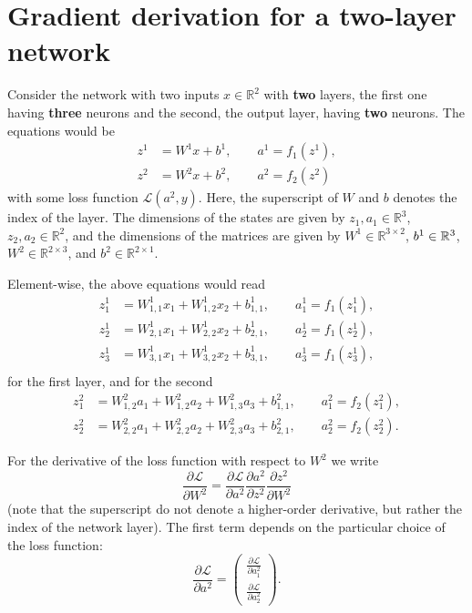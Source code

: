 \documentclass[a4paper,11pt]{article}
\newcommand{\of}[1]{\left( {#1} \right)}
\newcommand{\fracp}[2]{\frac{\partial{}{#1}}{\partial{}{#2}}}
\begin{document}
\section*{Gradient derivation for a two-layer network}
Consider the network with two inputs $x\in\mathbb{R}^2$ with {\bf two}
layers, the first one having {\bf three} neurons and the second, the
output layer, having {\bf two} neurons. The equations would be
\[
\begin{split}
z^1 &= W^1 x + b^1, \qquad a^1 = f_1\of{z^1},\\
z^2 &= W^2 x + b^2, \qquad a^2 = f_2(z^2)
\end{split}
\]
with some loss function $\mathcal{L}\of{a^2,y}$. Here, the superscript
of $W$ and $b$ denotes the index of the layer. The dimensions of the
states are given by $z_1, a_1 \in \mathbb{R}^3$, $z_2, a_2 \in
\mathbb{R}^2$, and the dimensions of the matrices are given by $W^1
\in \mathbb{R}^{3\times 2}$, $b^1 \in \mathbb{R}^{3 \time 1}$, $W^2
\in \mathbb{R}^{2 \times 3}$, and $b^2 \in \mathbb{R}^{2 \times 1}$.

Element-wise, the above equations would read
\[
\begin{split}
z^1_1 &= W^1_{1,1} x_1 + W^1_{1,2} x_2 + b^1_{1,1}, \qquad
a^1_1  = f_1\of{z^1_1},\\
z^1_2 &= W^1_{2,1} x_1 + W^1_{2,2} x_2 + b^1_{2,1}, \qquad
a^1_2  = f_1\of{z^1_2},\\
z^1_3 &= W^1_{3,1} x_1 + W^1_{3,2} x_2 + b^1_{3,1}, \qquad
a^1_3  = f_1\of{z^1_3},\\
\end{split}
\]
for the first layer, and for the second
\[
\begin{split}
z^2_1 &= W^2_{1,2} a_1 + W^2_{1,2} a_2 + W^2_{1,3} a_3 + b^2_{1,1}, \qquad
a^2_1  = f_2\of{z^2_1},\\
z^2_2 &= W^2_{2,2} a_1 + W^2_{2,2} a_2 + W^2_{2,3} a_3 + b^2_{2,1}, \qquad
a^2_2  = f_2\of{z^2_2}.
\end{split}
\]

For the derivative of the loss function with respect to $W^2$ we write
\[
\fracp{\mathcal{L}}{W^2} = \fracp{\mathcal{L}}{a^2}\fracp{a^2}{z^2}\fracp{z^2}{W^2}
\]
(note that the superscript do not denote a higher-order derivative,
but rather the index of the network layer). The first term depends on the particular choice of the loss function:
\[
\fracp{\mathcal{L}}{a^2} =
\begin{pmatrix}
\fracp{\mathcal{L}}{a^2_1}\\
\fracp{\mathcal{L}}{a^2_2}
\end{pmatrix}.
\]
\end{document}
